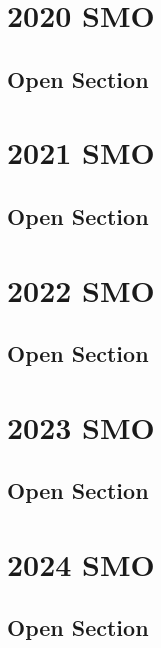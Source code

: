 \documentclass[a4paper,listof=totoc,bibliography=totoc,openany]{scrbook}
\begin{document}

\chapter{2020 SMO}
\section{Open Section}


\chapter{2021 SMO}
\section{Open Section}


\chapter{2022 SMO}
\section{Open Section}



\chapter{2023 SMO}
\section{Open Section}



\chapter{2024 SMO}
\section{Open Section}


\end{document}
